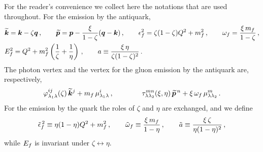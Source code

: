 For the reader's convenience we collect here the notations that are used throughout. For the emission
by the antiquark,
\begin{align}
&\widetilde{\bm{k}}=\bm{k}-\zeta\bm{q}\,,\qquad \widetilde{\bm{p}}=\bm{p}-\frac{\xi}{1-\zeta}(\bm{q}-\bm{k})\,,\qquad
\epsilon_f^2=\zeta(1-\zeta)Q^2+m_f^2\,,\qquad \omega_f=\frac{\xi\,m_f}{1-\zeta}\,,
\nonumber\\
&E_f^2=Q^2+m_f^2\left(\frac1\zeta+\frac1\eta\right)\,,\qquad
a\equiv\frac{\xi\,\eta}{\zeta(1-\zeta)^2}\,.
\label{eq:notation}
\end{align}
The photon vertex and the vertex for the gluon emission by the antiquark are, respectively,
\begin{equation}
\varphi^{ij}_{\lambda_1\lambda}(\zeta)\,\widetilde{\bm{k}}^j+m_f\,\mu^i_{\lambda_1\lambda}\,,\qquad\qquad
\tau^{mn}_{\lambda\lambda_2}(\xi,\eta)\,\widetilde{\bm{p}}^{\,n}+\xi\,\omega_f\,\mu^m_{\lambda\lambda_2}\,.
\label{eq:vertices}
\end{equation}
For the emission by the quark the roles of $\zeta$ and $\eta$ are exchanged, and we define
\begin{equation}
\tilde{\epsilon}_f^{\,2}\equiv\eta(1-\eta)Q^2+m_f^2\,,\qquad \tilde{\omega}_f\equiv\frac{\xi\,m_f}{1-\eta}\,,\qquad
\tilde a\equiv\frac{\xi\,\zeta}{\eta(1-\eta)^2}\,,
\label{eq:notation-q}
\end{equation}
while $E_f$ is invariant under $\zeta\leftrightarrow\eta$.
